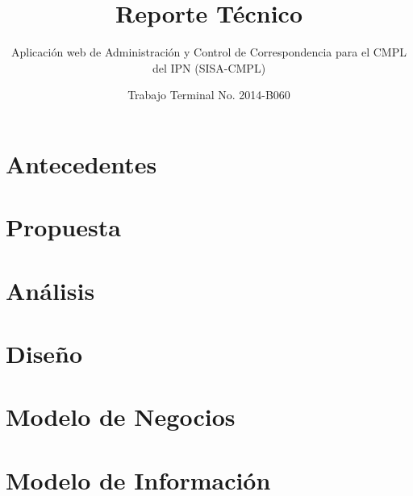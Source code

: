 \documentclass[oneside,10pt]{book}
\title{Reporte Técnico}
\subtitle{Aplicación web de Administración y Control de Correspondencia para el CMPL del IPN (SISA-CMPL)}
\author{Trabajo Terminal No. 2014-B060}
\begin{document}
\maketitle
\thispagestyle{empty}

\frontmatter
\tableofcontents

\mainmatter

\chapter{Antecedentes}
	
	

\chapter{Propuesta}


\chapter{Análisis}


\chapter{Diseño}



\chapter{Modelo de Negocios}




\chapter{Modelo de Información}

\end{document}
